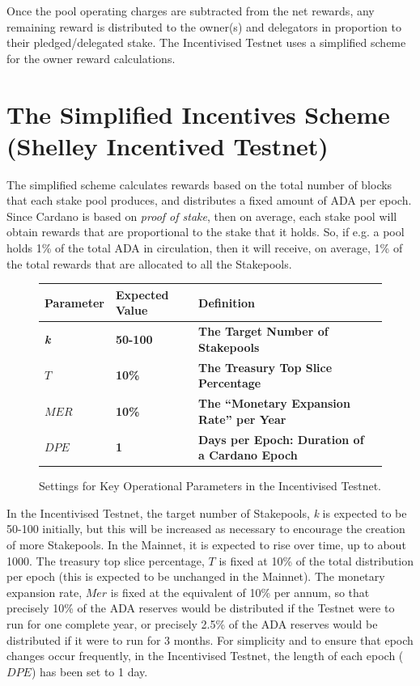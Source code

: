 \documentclass[11pt,a4paper,dvipsnames,twosided,final]{article}
\newcommand{\ada}{ADA{}}
\newcommand{\cardano}[1]{Cardano}
\begin{document}
Once the pool operating charges are subtracted from the net rewards, any remaining reward is distributed to the owner(s) and delegators
in proportion to their pledged/delegated stake.  The Incentivised Testnet uses a simplified scheme for the owner reward calculations.


\clearpage
\section{The Simplified Incentives Scheme (Shelley Incentived Testnet)}
\label{sec:testnet}

The simplified scheme calculates rewards based on the total number of blocks that each stake pool produces,
and distributes a fixed amount of \ada{} per epoch.
Since \cardano{} is based on \emph{proof of stake}, then on average, each stake pool will obtain
rewards that are proportional to the stake that it holds.  So, if e.g. a pool holds 1\% of the total
\ada{} in circulation, then it will receive, on average, 1\% of the total rewards that are allocated to all the
Stakepools.

\begin{figure}[h!]
\begin{center}
\begin{tabular}{||l|l|p{10cm}|l||}
  \hline \hline
\textbf{Parameter} & \textbf{Expected Value} & \textbf{Definition} \\\hline
\textbf{\color{green} \emph{k}} & \textbf{\color{green} 50-100} &\textbf{\color{green}  The Target Number of Stakepools} \\\hline
\textbf{\color{green} $T$} & \textbf{\color{green} 10\%} & \textbf{\color{green} The Treasury Top Slice Percentage} \\\hline
\textbf{\color{green} $\textit{MER}$} & \textbf{\color{green} 10\%}&  \textbf{\color{green} The ``Monetary Expansion Rate'' per Year}\\\hline
\textbf{\color{green} $\textit{DPE}$} & \textbf{\color{green} 1} & \textbf{\color{green}  Days per Epoch: Duration of a \cardano{} Epoch} \\\hline
  \hline
\end{tabular}
\end{center}
\caption{Settings for Key Operational Parameters in the Incentivised Testnet.}
\end{figure}

\noindent
In the Incentivised Testnet,
the target number of Stakepools, \emph{k} is expected to be 50-100 initially, but this will be increased as necessary to encourage the creation of more Stakepools.
In the Mainnet, it is expected to rise over time, up to about 1000.
The treasury top slice percentage, $T$ is fixed at 10\% of the total distribution per epoch (this is expected to be unchanged in the Mainnet).
The monetary expansion rate, $\textit{Mer}$ is fixed at the equivalent of 10\% per annum, so that precisely 10\% of the \ada{} reserves would be distributed
if the Testnet were to run for one complete year, or precisely 2.5\% of the \ada{} reserves would be distributed if it were to run for 3 months.
For simplicity and to ensure that epoch changes occur frequently, in the Incentivised Testnet, the length of each epoch ($\textit{DPE}$) has been set to 1 day.
\end{document}
